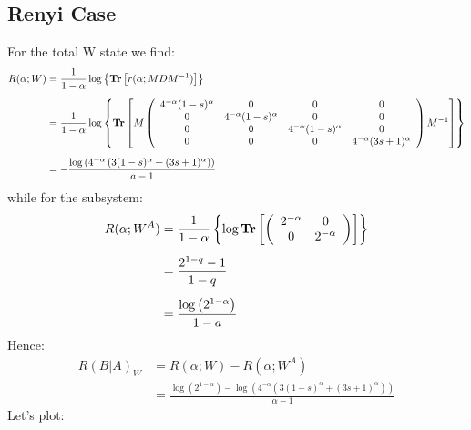 \subsection{Renyi Case}
\noindent
For the total W state we find:
\begin{align}
R(\alpha;W) &= \frac{1}{1-\alpha}\log \left\{ \operatorname{\textup{\textbf{Tr}}} \left[ r(\alpha;MDM^{-1}) \right] \right\} \nonumber \\[0.5em]
&=\frac{1}{1-\alpha} \log \left\{ \operatorname{\textup{\textbf{Tr}}} \left[
M
\left(
\begin{array}{cccc}
 4^{-\alpha } (1-s)^{\alpha } & 0 & 0 & 0 \\
 0 & 4^{-\alpha } (1-s)^{\alpha } & 0 & 0 \\
 0 & 0 & 4^{-\alpha } (1-s)^{\alpha } & 0 \\
 0 & 0 & 0 & 4^{-\alpha } (3 s+1)^{\alpha } \\
\end{array}
\right)
M^{-1}
\right] \right\}
\nonumber\\[0.5em]
&=-\frac{\log \left(4^{-\alpha } \left(3 (1-s)^{\alpha }+(3 s+1)^{\alpha }\right)\right)}{a-1}
\end{align}
while for the subsystem:
\begin{align}
R(\alpha;W^A)&= \frac{1}{1-\alpha} \left\{\log \operatorname{\textup{\textbf{Tr}}} \left[ \left(
\begin{array}{cc}
 2^{-\alpha } & 0 \\
 0 & 2^{-\alpha } \\
\end{array}
\right) \right] \right\} \nonumber \\[0.5em] &= \frac{2^{1-q}-1}{1-q}  \\[0.5em] &=
\frac{\log \left(2^{1-\alpha }\right)}{1-a}
\end{align}
Hence:
\begin{align}
R(B|A)_{W}&=R(\alpha;W)-R(\alpha;W^{A})
\nonumber \\[0.5em] &=
\frac{\log \left(2^{1-\alpha }\right)-\log \left(4^{-\alpha } \left(3 (1-s)^{\alpha }+(3 s+1)^{\alpha }\right)\right)}{\alpha -1}
\label{renyicasecalc}
\end{align}
Let's plot:
